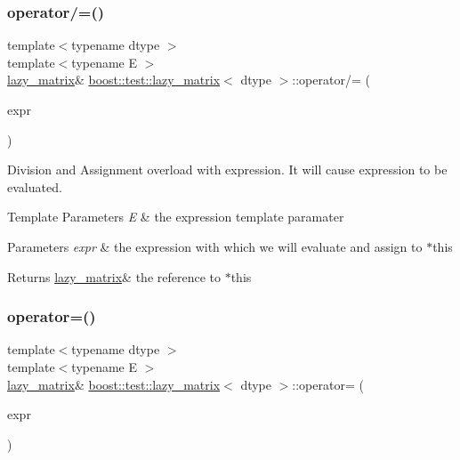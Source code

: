 \subsubsection{\texorpdfstring{operator/=()}{operator/=()}}
{\footnotesize\ttfamily template$<$typename dtype $>$ \\
template$<$typename E $>$ \\
\mbox{\hyperlink{classboost_1_1test_1_1lazy__matrix}{lazy\+\_\+matrix}}\& \mbox{\hyperlink{classboost_1_1test_1_1lazy__matrix}{boost\+::test\+::lazy\+\_\+matrix}}$<$ dtype $>$\+::operator/= (\begin{DoxyParamCaption}\item[{\mbox{\hyperlink{classboost_1_1test_1_1expression}{expression}}$<$ E $>$ const \&}]{expr }\end{DoxyParamCaption})\hspace{0.3cm}{\ttfamily [inline]}}



Division and Assignment overload with expression. It will cause expression to be evaluated. 


\begin{DoxyTemplParams}{Template Parameters}
{\em E} & the expression template paramater \\
\hline
\end{DoxyTemplParams}

\begin{DoxyParams}{Parameters}
{\em expr} & the expression with which we will evaluate and assign to $\ast$this \\
\hline
\end{DoxyParams}
\begin{DoxyReturn}{Returns}
\mbox{\hyperlink{classboost_1_1test_1_1lazy__matrix}{lazy\+\_\+matrix}}\& the reference to $\ast$this 
\end{DoxyReturn}
\mbox{\label{classboost_1_1test_1_1lazy__matrix_abd458b7f3964d5682af566f4199e1411}} 
\subsubsection{\texorpdfstring{operator=()}{operator=()}\hspace{0.1cm}{\footnotesize\ttfamily [1/2]}}
{\footnotesize\ttfamily template$<$typename dtype $>$ \\
template$<$typename E $>$ \\
\mbox{\hyperlink{classboost_1_1test_1_1lazy__matrix}{lazy\+\_\+matrix}}\& \mbox{\hyperlink{classboost_1_1test_1_1lazy__matrix}{boost\+::test\+::lazy\+\_\+matrix}}$<$ dtype $>$\+::operator= (\begin{DoxyParamCaption}\item[{\mbox{\hyperlink{classboost_1_1test_1_1expression}{expression}}$<$ E $>$ const \&}]{expr }\end{DoxyParamCaption})\hspace{0.3cm}{\ttfamily [inline]}}



